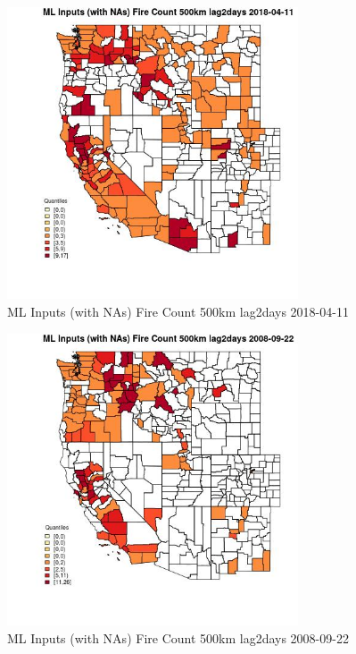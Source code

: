 \begin{figure} 
\centering  
\includegraphics[width=0.77\textwidth]{Code_Outputs/Report_ML_input_PM25_Step4_part_e_de_duplicated_aves_compiled_2019-05-18wNAs_CountyFire_Count_500km_lag2daysMean2018-04-11_2018-04-11.jpg} 
\caption{\label{fig:Report_ML_input_PM25_Step4_part_e_de_duplicated_aves_compiled_2019-05-18wNAsCountyFire_Count_500km_lag2daysMean2018-04-11_2018-04-11}ML Inputs (with NAs) Fire Count 500km lag2days 2018-04-11} 
\end{figure} 
 

\begin{figure} 
\centering  
\includegraphics[width=0.77\textwidth]{Code_Outputs/Report_ML_input_PM25_Step4_part_e_de_duplicated_aves_compiled_2019-05-18wNAs_CountyFire_Count_500km_lag2daysMean2008-09-22_2008-09-22.jpg} 
\caption{\label{fig:Report_ML_input_PM25_Step4_part_e_de_duplicated_aves_compiled_2019-05-18wNAsCountyFire_Count_500km_lag2daysMean2008-09-22_2008-09-22}ML Inputs (with NAs) Fire Count 500km lag2days 2008-09-22} 
\end{figure} 
 

